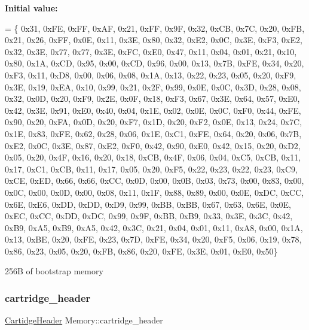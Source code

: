 {\bfseries Initial value\+:}
\begin{DoxyCode}
= \{ 
            0x31, 0xFE, 0xFF, 0xAF, 0x21, 0xFF, 0x9F, 0x32, 0xCB, 0x7C, 0x20, 0xFB,
            0x21, 0x26, 0xFF, 0x0E, 0x11, 0x3E, 0x80, 0x32, 0xE2, 0x0C, 0x3E, 0xF3,
            0xE2, 0x32, 0x3E, 0x77, 0x77, 0x3E, 0xFC, 0xE0, 0x47, 0x11, 0x04, 0x01,
            0x21, 0x10, 0x80, 0x1A, 0xCD, 0x95, 0x00, 0xCD, 0x96, 0x00, 0x13, 0x7B,
            0xFE, 0x34, 0x20, 0xF3, 0x11, 0xD8, 0x00, 0x06, 0x08, 0x1A, 0x13, 0x22,
            0x23, 0x05, 0x20, 0xF9, 0x3E, 0x19, 0xEA, 0x10, 0x99, 0x21, 0x2F, 0x99,
            0x0E, 0x0C, 0x3D, 0x28, 0x08, 0x32, 0x0D, 0x20, 0xF9, 0x2E, 0x0F, 0x18,
            0xF3, 0x67, 0x3E, 0x64, 0x57, 0xE0, 0x42, 0x3E, 0x91, 0xE0, 0x40, 0x04,
            0x1E, 0x02, 0x0E, 0x0C, 0xF0, 0x44, 0xFE, 0x90, 0x20, 0xFA, 0x0D, 0x20,
            0xF7, 0x1D, 0x20, 0xF2, 0x0E, 0x13, 0x24, 0x7C, 0x1E, 0x83, 0xFE, 0x62,
            0x28, 0x06, 0x1E, 0xC1, 0xFE, 0x64, 0x20, 0x06, 0x7B, 0xE2, 0x0C, 0x3E,
            0x87, 0xE2, 0xF0, 0x42, 0x90, 0xE0, 0x42, 0x15, 0x20, 0xD2, 0x05, 0x20,
            0x4F, 0x16, 0x20, 0x18, 0xCB, 0x4F, 0x06, 0x04, 0xC5, 0xCB, 0x11, 0x17,
            0xC1, 0xCB, 0x11, 0x17, 0x05, 0x20, 0xF5, 0x22, 0x23, 0x22, 0x23, 0xC9,
            0xCE, 0xED, 0x66, 0x66, 0xCC, 0x0D, 0x00, 0x0B, 0x03, 0x73, 0x00, 0x83,
            0x00, 0x0C, 0x00, 0x0D, 0x00, 0x08, 0x11, 0x1F, 0x88, 0x89, 0x00, 0x0E,
            0xDC, 0xCC, 0x6E, 0xE6, 0xDD, 0xDD, 0xD9, 0x99, 0xBB, 0xBB, 0x67, 0x63,
            0x6E, 0x0E, 0xEC, 0xCC, 0xDD, 0xDC, 0x99, 0x9F, 0xBB, 0xB9, 0x33, 0x3E,
            0x3C, 0x42, 0xB9, 0xA5, 0xB9, 0xA5, 0x42, 0x3C, 0x21, 0x04, 0x01, 0x11,
            0xA8, 0x00, 0x1A, 0x13, 0xBE, 0x20, 0xFE, 0x23, 0x7D, 0xFE, 0x34, 0x20,
            0xF5, 0x06, 0x19, 0x78, 0x86, 0x23, 0x05, 0x20, 0xFB, 0x86, 0x20, 0xFE,
            0x3E, 0x01, 0xE0, 0x50\}
\end{DoxyCode}
256B of bootstrap memory \mbox{\label{classMemory_a6459c5b106a92a3f24673a3448a1bab0}} 
\subsubsection{\texorpdfstring{cartridge\+\_\+header}{cartridge\_header}}
{\footnotesize\ttfamily \mbox{\hyperlink{structCartidgeHeader}{Cartidge\+Header}} Memory\+::cartridge\+\_\+header}

